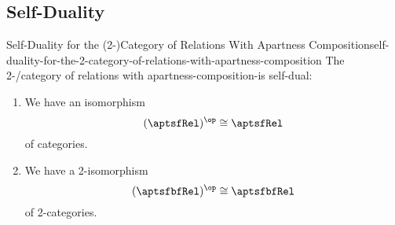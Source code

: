 \subsection{Self-Duality}\label{subsection-self-duality-of-rel-apartness}
\begin{proposition}{Self-Duality for the (2-)Category of Relations With Apartness Composition}{self-duality-for-the-2-category-of-relations-with-apartness-composition}%
    The 2-/category of relations with apartness-composition-is self-dual:
    \begin{enumerate}
        \item\label{self-duality-for-the-2-category-of-relations-with-apartness-composition-1}We have an isomorphism
            \[
                (\aptsfRel)^{\op}%
                \cong%
                \aptsfRel%
            \]%
            of categories.
        \item\label{self-duality-for-the-2-category-of-relations-with-apartness-composition-2}We have a 2-isomorphism
            \[
                (\aptsfbfRel)^{\op}%
                \cong%
                \aptsfbfRel%
            \]%
            of 2-categories.
    \end{enumerate}
\end{proposition}
